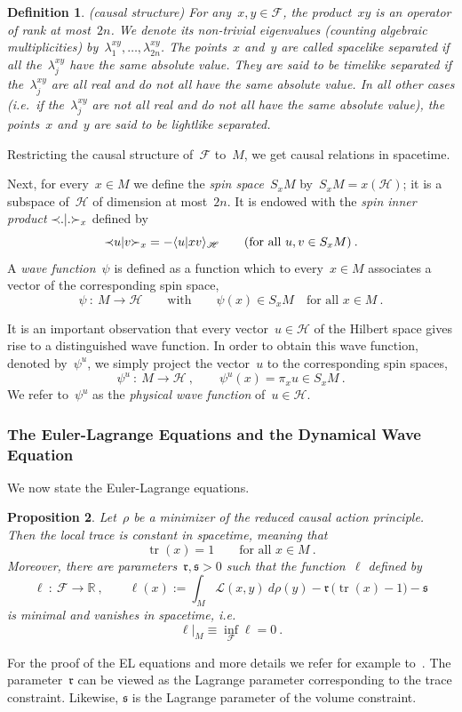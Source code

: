 \documentclass[reqno,11pt]{amsart}
\numberwithin{equation}{section}
\newtheorem{Def}{Definition}[section]
\newtheorem{Prp}[Def]{Proposition}
\newcommand{\beq}{\begin{equation}}
\newcommand{\eeq}{\end{equation}}
\newcommand{\la}{\langle}
\newcommand{\ra}{\rangle}
\newcommand{\Sl}{\mbox{$\prec \!\!$ \nolinebreak}}
\newcommand{\Sr}{\mbox{\nolinebreak $\succ$}}
\newcommand{\R}{\mathbb{R}}
\newcommand{\1}{\mathds{1}}
\DeclareMathOperator{\tr}{tr}
\renewcommand{\L}{{\mathcal{L}}}
\renewcommand{\H}{\mathscr{H}}
\newcommand{\F}{{\mathscr{F}}}
\newcommand{\s}{\mathfrak{s}}
\begin{document}
\begin{Def} (causal structure) \label{def2}
{\em{For any~$x, y \in \F$, the product~$x y$ is an operator
of rank at most~$2n$. We denote its non-trivial eigenvalues (counting algebraic multiplicities)
by~$\lambda^{xy}_1, \ldots, \lambda^{xy}_{2n}$.
The points~$x$ and~$y$ are
called {\em{spacelike}} separated if all the~$\lambda^{xy}_j$ have the same absolute value.
They are said to be {\em{timelike}} separated if the~$\lambda^{xy}_j$ are all real and do not all 
have the same absolute value.
In all other cases (i.e.\ if the~$\lambda^{xy}_j$ are not all real and do not all 
have the same absolute value),
the points~$x$ and~$y$ are said to be {\em{lightlike}} separated. }}
\end{Def} \noindent
Restricting the causal structure of~$\F$ to~$M$, we get causal relations in spacetime.

Next, for every~$x \in M$ we define the {\em{spin space}}~$S_xM$ by~$S_xM = x(\H)$;
it is a subspace of~$\H$ of dimension at most~$2n$.
It is endowed with the {\em{spin inner product}} $\Sl .|. \Sr_x$ defined by
\beq \label{ssp}
\Sl u | v \Sr_x = -\la u | x v \ra_\H \qquad \text{(for all $u,v \in S_xM$)}\:.
\eeq
A {\em{wave function}}~$\psi$ is defined as a function
which to every~$x \in M$ associates a vector of the corresponding spin space,
\beq \label{psirep}
\psi \::\: M \rightarrow \H \qquad \text{with} \qquad \psi(x) \in S_xM \quad \text{for all~$x \in M$}\:.
\eeq

It is an important observation that every vector~$u \in \H$ of the Hilbert space gives rise to a distinguished
wave function. In order to obtain this wave function, denoted by~$\psi^u$, we simply project the vector~$u$
to the corresponding spin spaces,
\beq \label{psiudef}
\psi^u \::\: M \rightarrow \H\:,\qquad \psi^u(x) = \pi_x u \in S_xM \:.
\eeq
We refer to~$\psi^u$ as the {\em{physical wave function}} of~$u \in \H$.

\subsubsection{The Euler-Lagrange Equations and the Dynamical Wave Equation}
We now state the Euler-Lagrange equations.
\begin{Prp} Let~$\rho$ be a minimizer of the reduced causal action principle.
Then the local trace is constant in spacetime, meaning that
\[ %
\tr(x) = 1 \qquad \text{for all~$x \in M$} \:. \]
Moreover, there are parameters~$\mathfrak{r}, \s>0$ such that
the function~$\ell$ defined by
\[ %
\ell \::\: \F \rightarrow \R\:,\qquad \ell(x) := \int_M \L(x,y)\: d\rho(y) - \mathfrak{r}\, \big( \tr(x) -1 \big) - \s \]
is minimal and vanishes in spacetime, i.e.\
\beq \label{EL}
\ell|_M \equiv \inf_\F \ell = 0 \:.
\eeq
\end{Prp} \noindent
For the proof of the EL equations and more details we refer for example to~\cite{nonlocal}.
The parameter~$\mathfrak{r}$ can be viewed as the Lagrange parameter corresponding to the
trace constraint. Likewise, $\s$ is the Lagrange parameter of the volume constraint.
\end{document}
